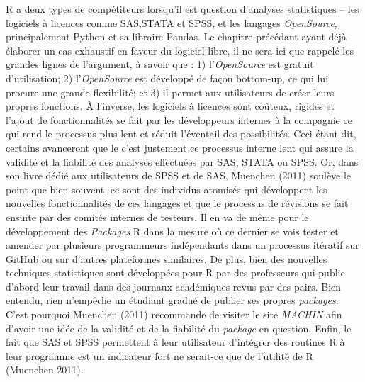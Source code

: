 \documentclass[
  letterpaper,
  DIV=11,
  numbers=noendperiod]{scrreprt}
\begin{document}
R a deux types de compétiteurs lorsqu'il est question d'analyses
statistiques -- les logiciels à licences comme SAS,STATA et SPSS, et les
langages \emph{OpenSource}, principalement Python et sa libraire Pandas.
Le chapitre précédant ayant déjà élaborer un cas exhaustif en faveur du
logiciel libre, il ne sera ici que rappelé les grandes lignes de
l'argument, à savoir que : 1) l'\emph{OpenSource} est gratuit
d'utilisation; 2) l'\emph{OpenSource} est développé de façon bottom-up,
ce qui lui procure une grande flexibilité; et 3) il permet aux
utilisateurs de créer leurs propres fonctions. À l'inverse, les
logiciels à licences sont coûteux, rigides et l'ajout de fonctionnalités
se fait par les développeurs internes à la compagnie ce qui rend le
processus plus lent et réduit l'éventail des possibilités. Ceci étant
dit, certains avanceront que le c'est justement ce processus interne
lent qui assure la validité et la fiabilité des analyses effectuées par
SAS, STATA ou SPSS. Or, dans son livre dédié aux utilisateurs de SPSS et
de SAS, Muenchen (2011) soulève le point que bien souvent, ce sont des
individus atomisés qui développent les nouvelles fonctionnalités de ces
langages et que le processus de révisions se fait ensuite par des
comités internes de testeurs. Il en va de même pour le développement des
\emph{Packages} R dans la mesure où ce dernier se vois tester et amender
par plusieurs programmeurs indépendants dans un processus itératif sur
GitHub ou sur d'autres plateformes similaires. De plus, bien des
nouvelles techniques statistiques sont développées pour R par des
professeurs qui publie d'abord leur travail dans des journaux
académiques revus par des pairs. Bien entendu, rien n'empêche un
étudiant gradué de publier ses propres \emph{packages}. C'est pourquoi
Muenchen (2011) recommande de visiter le site \emph{MACHIN} afin d'avoir
une idée de la validité et de la fiabilité du \emph{package} en
question. Enfin, le fait que SAS et SPSS permettent à leur utilisateur
d'intégrer des routines R à leur programme est un indicateur fort ne
serait-ce que de l'utilité de R (Muenchen 2011).
\end{document}
